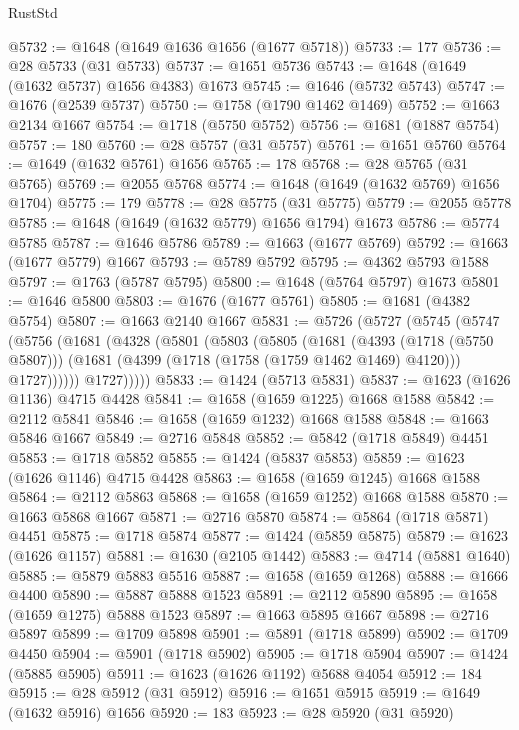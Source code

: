 \begin{lexlean}{RustStd}
\begin{coremodule}
@5732 := @1648 (@1649 @1636 @1656 (@1677 @5718))
@5733 := 177
@5736 := @28 @5733 (@31 @5733)
@5737 := @1651 @5736
@5743 := @1648 (@1649 (@1632 @5737) @1656 @4383) @1673
@5745 := @1646 (@5732 @5743)
@5747 := @1676 (@2539 @5737)
@5750 := @1758 (@1790 @1462 @1469)
@5752 := @1663 @2134 @1667
@5754 := @1718 (@5750 @5752)
@5756 := @1681 (@1887 @5754)
@5757 := 180
@5760 := @28 @5757 (@31 @5757)
@5761 := @1651 @5760
@5764 := @1649 (@1632 @5761) @1656
@5765 := 178
@5768 := @28 @5765 (@31 @5765)
@5769 := @2055 @5768
@5774 := @1648 (@1649 (@1632 @5769) @1656 @1704)
@5775 := 179
@5778 := @28 @5775 (@31 @5775)
@5779 := @2055 @5778
@5785 := @1648 (@1649 (@1632 @5779) @1656 @1794) @1673
@5786 := @5774 @5785
@5787 := @1646 @5786
@5789 := @1663 (@1677 @5769)
@5792 := @1663 (@1677 @5779) @1667
@5793 := @5789 @5792
@5795 := @4362 @5793 @1588
@5797 := @1763 (@5787 @5795)
@5800 := @1648 (@5764 @5797) @1673
@5801 := @1646 @5800
@5803 := @1676 (@1677 @5761)
@5805 := @1681 (@4382 @5754)
@5807 := @1663 @2140 @1667
@5831 := @5726
    (@5727
      (@5745
        (@5747
          (@5756
            (@1681
              (@4328
                (@5801
                  (@5803
                    (@5805
                      (@1681
                        (@4393 (@1718 (@5750 @5807)))
                        (@1681 (@4399 (@1718 (@1758 (@1759 @1462 @1469) @4120))) @1727))))))
              @1727)))))
@5833 := @1424 (@5713 @5831)
@5837 := @1623 (@1626 @1136) @4715 @4428
@5841 := @1658 (@1659 @1225) @1668 @1588
@5842 := @2112 @5841
@5846 := @1658 (@1659 @1232) @1668 @1588
@5848 := @1663 @5846 @1667
@5849 := @2716 @5848
@5852 := @5842 (@1718 @5849) @4451
@5853 := @1718 @5852
@5855 := @1424 (@5837 @5853)
@5859 := @1623 (@1626 @1146) @4715 @4428
@5863 := @1658 (@1659 @1245) @1668 @1588
@5864 := @2112 @5863
@5868 := @1658 (@1659 @1252) @1668 @1588
@5870 := @1663 @5868 @1667
@5871 := @2716 @5870
@5874 := @5864 (@1718 @5871) @4451
@5875 := @1718 @5874
@5877 := @1424 (@5859 @5875)
@5879 := @1623 (@1626 @1157)
@5881 := @1630 (@2105 @1442)
@5883 := @4714 (@5881 @1640)
@5885 := @5879 @5883 @5516
@5887 := @1658 (@1659 @1268)
@5888 := @1666 @4400
@5890 := @5887 @5888 @1523
@5891 := @2112 @5890
@5895 := @1658 (@1659 @1275) @5888 @1523
@5897 := @1663 @5895 @1667
@5898 := @2716 @5897
@5899 := @1709 @5898
@5901 := @5891 (@1718 @5899)
@5902 := @1709 @4450
@5904 := @5901 (@1718 @5902)
@5905 := @1718 @5904
@5907 := @1424 (@5885 @5905)
@5911 := @1623 (@1626 @1192) @5688 @4054
@5912 := 184
@5915 := @28 @5912 (@31 @5912)
@5916 := @1651 @5915
@5919 := @1649 (@1632 @5916) @1656
@5920 := 183
@5923 := @28 @5920 (@31 @5920)

\end{coremodule}
\end{lexlean}
